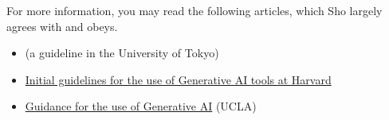 \documentclass[11pt,pdfa,lastpage]{MishoNote}
\begin{document}
\begin{enumerate}
\begin{itemize}
\end{itemize}
\end{enumerate}

\noindent
For more information, you may read the following articles, which Sho largely agrees with and obeys.
\begin{itemize}
 \item \href{https://utelecon.adm.u-tokyo.ac.jp/docs/ai-tools-in-classes}{} (a guideline in the University of Tokyo)
 \item \href{https://huit.harvard.edu/ai/guidelines}{Initial guidelines for the use of Generative AI tools at Harvard}
 \item \href{https://teaching.ucla.edu/resources/ai_guidance/}{Guidance for the use of Generative AI} (UCLA)
\end{itemize}
\end{document}
